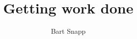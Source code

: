 \documentclass{ximera}
\title{Getting work done}
\author{Bart Snapp}
\begin{document}
\begin{abstract}
\end{abstract}
\maketitle
\end{document}
